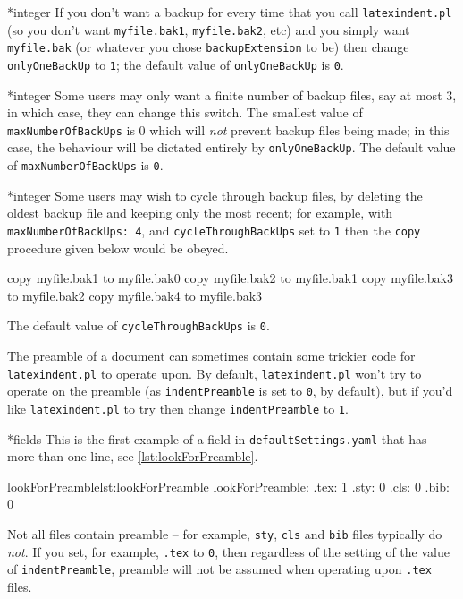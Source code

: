 \documentclass[8pt]{article}
\begin{document}
*{integer}
\label{page:onlyonebackup}
If you don't want a backup for every time that you call \texttt{latexindent.pl} (so
you don't want \texttt{myfile.bak1}, \texttt{myfile.bak2}, etc) and you simply
want \texttt{myfile.bak} (or whatever you chose \texttt{backupExtension} to be)
then change \texttt{onlyOneBackUp} to \texttt{1}; the default value of
\texttt{onlyOneBackUp} is \texttt{0}.

*{integer}
Some users may only want a finite number of backup files,
say at most $3$, in which case, they can change this switch.
The smallest value of \texttt{maxNumberOfBackUps} is $0$ which will \emph{not}
prevent backup files being made; in this case, the behaviour will be dictated
entirely by \texttt{onlyOneBackUp}. The default value of \texttt{maxNumberOfBackUps}
is \texttt{0}.

*{integer}
Some users may wish to cycle through backup files, by deleting the
oldest backup file and keeping only the most recent; for example,
with \texttt{maxNumberOfBackUps: 4}, and \texttt{cycleThroughBackUps}
set to \texttt{1}  then the \texttt{copy} procedure given below
would be obeyed.

\begin{commandshell}
copy myfile.bak1 to myfile.bak0
copy myfile.bak2 to myfile.bak1
copy myfile.bak3 to myfile.bak2
copy myfile.bak4 to myfile.bak3
	\end{commandshell}
The default value of \texttt{cycleThroughBackUps} is \texttt{0}.


The preamble of a document can sometimes contain some trickier code
for \texttt{latexindent.pl} to operate upon. By default, \texttt{latexindent.pl}
won't try to operate on the preamble (as \texttt{indentPreamble} is set to \texttt{0},
by default), but if you'd like \texttt{latexindent.pl} to try then change \texttt{indentPreamble} to \texttt{1}.

*{fields}
This is the first example of a field in \texttt{defaultSettings.yaml} that has more than one line, see \cref{lst:lookForPreamble}.
\begin{yaml}[firstnumber=57]{lookForPreamble}{lst:lookForPreamble}
lookForPreamble:
    .tex: 1
    .sty: 0
    .cls: 0
    .bib: 0
\end{yaml}

Not all files contain preamble -- for example, \texttt{sty}, \texttt{cls} and \texttt{bib} files typically do \emph{not}. If you 
set, for example, \texttt{.tex} to \texttt{0}, then regardless of the setting of the value of \texttt{indentPreamble}, preamble
will not be assumed when operating upon \texttt{.tex} files.
\end{document}
